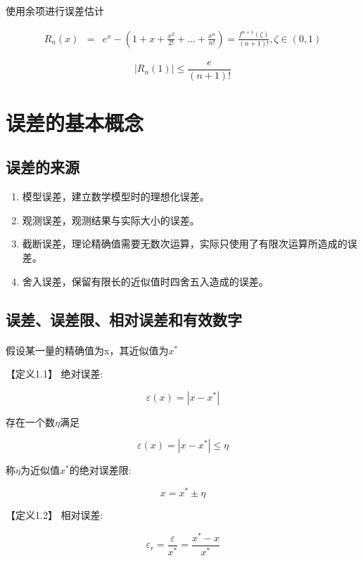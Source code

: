 \documentclass[12pt]{report}
\begin{document}
使用余项进行误差估计

\begin{equation}
	\begin{aligned}
		R_n(x) & = & e^x - \left(1 + x + \frac{x^2}{2!} + \ldots + \frac{x^n}{n!}\right) = \frac{f^{n+1}(\zeta)}{(n+1)!}, \zeta \in \left(0, 1\right)
	\end{aligned}
\end{equation}

\[
	|R_n(1)| \leq \frac{e}{(n+1)!}
\]


\section{误差的基本概念}

\subsection{误差的来源}

\begin{enumerate}
	\item 模型误差，建立数学模型时的理想化误差。
	\item 观测误差，观测结果与实际大小的误差。
	\item 截断误差，理论精确值需要无数次运算，实际只使用了有限次运算所造成的误差。
	\item 舍入误差，保留有限长的近似值时四舍五入造成的误差。
\end{enumerate}

\subsection{误差、误差限、相对误差和有效数字}

\paragraph{ } 假设某一量的精确值为x，其近似值为$x^*$

【定义1.1】 \quad 绝对误差:

\[ \varepsilon (x) = |x - x^*| \]

存在一个数$\eta$满足

\[ \varepsilon (x) = |x - x^*| \leq \eta \]

称$\eta$为近似值$x^*$的绝对误差限:

\[ x = x^* \pm \eta \]

【定义1.2】 \quad 相对误差:

\[ \varepsilon_r = \frac{\varepsilon}{x^*} = \frac{x^* - x}{x^*} \]
\end{document}
